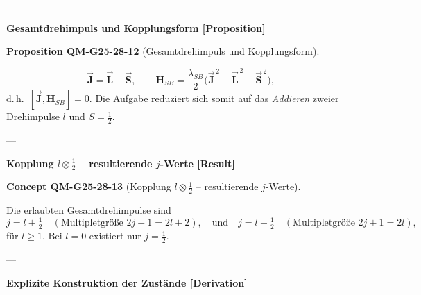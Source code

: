\documentclass[10pt, letterpaper]{article}
\newcommand{\CustomHeading}[3]{%
  \par\medskip\noindent%
  \textbf{#1 #2} \textnormal{(#3)}.\enskip%
}
\newenvironment{PROP}[2]{\begin{unitbox}\CustomHeading{Proposition}{#1}{#2}}{\end{unitbox}}
\newenvironment{CONC}[2]{\begin{unitbox}\CustomHeading{Concept}{#1}{#2}}{\end{unitbox}}
\begin{document}
---

\textbf{Gesamtdrehimpuls und Kopplungsform [Proposition]}

\begin{PROP}{QM-G25-28-12}{Gesamtdrehimpuls und Kopplungsform}
\[
\vec{\mathbf J} = \vec{\mathbf L} + \vec{\mathbf S},\qquad
\mathbf{H}_{SB}=
\frac{\lambda_{SB}}{2}
\bigl(\vec{\mathbf J}^{\,2}-\vec{\mathbf L}^{\,2}-\vec{\mathbf S}^{\,2}\bigr),
\]
d.\,h.\ $[\vec{\mathbf J},\mathbf{H}_{SB}]=0$.  
Die Aufgabe reduziert sich somit auf das \emph{Addieren} zweier Drehimpulse
$l$ und $S=\tfrac12$.
\end{PROP}

---

\textbf{Kopplung $l\otimes\tfrac12$ – resultierende $j$-Werte [Result]}

\begin{CONC}{QM-G25-28-13}{Kopplung $l\otimes\tfrac12$ – resultierende $j$-Werte}
Die erlaubten Gesamtdrehimpulse sind
\[
j = l+\tfrac12 \quad (\text{Multipletgröße } 2j+1 = 2l+2),
\quad\text{und}\quad
j = l-\tfrac12 \quad (\text{Multipletgröße } 2j+1 = 2l),
\]
für $l\ge 1$.  Bei $l=0$ existiert nur $j=\tfrac12$.
\end{CONC}

---

\textbf{Explizite Konstruktion der Zustände [Derivation]}
\end{document}

